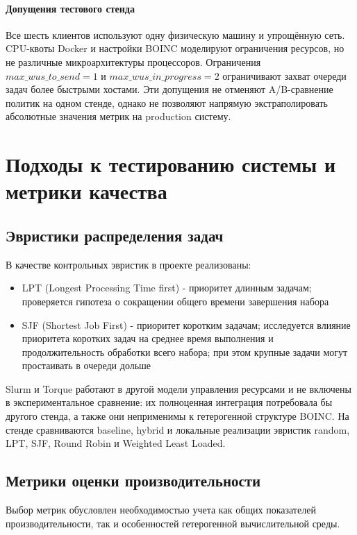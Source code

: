 \documentclass[a4paper,12pt]{extarticle}
\begin{document}
\paragraph{Допущения тестового стенда}
Все шесть клиентов используют одну физическую машину и упрощённую сеть. CPU-квоты Docker и настройки BOINC моделируют ограничения ресурсов, но не различные микроархитектуры процессоров. Ограничения $max\_wus\_to\_send=1$ и $max\_wus\_in\_progress=2$ ограничивают захват очереди задач более быстрыми хостами. Эти допущения не отменяют A/B-сравнение политик на одном стенде, однако не позволяют напрямую экстраполировать абсолютные значения метрик на production систему.

\newpage
\section{Подходы к тестированию системы и метрики качества}

\subsection{Эвристики распределения задач}

В качестве контрольных эвристик в проекте реализованы:
\begin{itemize}
    \item LPT (Longest Processing Time first) - приоритет длинным задачам; проверяется гипотеза о сокращении общего времени завершения набора
    \item SJF (Shortest Job First) - приоритет коротким задачам; исследуется влияние приоритета коротких задач на среднее время выполнения и продолжительность обработки всего набора; при этом крупные задачи могут простаивать в очереди дольше
\end{itemize}

Slurm и Torque работают в другой модели управления ресурсами и не включены в экспериментальное сравнение: их полноценная интеграция потребовала бы другого стенда, а также они неприменимы к гетерогенной структуре BOINC. На стенде сравниваются baseline, hybrid и локальные реализации эвристик random, LPT, SJF, Round Robin и Weighted Least Loaded.

\subsection{Метрики оценки производительности}

Выбор метрик обусловлен необходимостью учета как общих показателей производительности, так и особенностей гетерогенной вычислительной среды.
\end{document}
